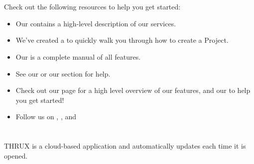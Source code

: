 \documentclass[letterpaper,10pt,english]{sphinxmanual}
\begin{document}
\section{}
\label{\detokenize{docs/introduction/index-thrux:new-user}}\label{\detokenize{docs/introduction/index-thrux:id1}}
Check out the following resources to help you get started:
\begin{itemize}
\item {} 
Our {\hyperref[\detokenize{docs/productoverview/index-product_overview:product-overview}]{}} contains a high-level description of our services.

\item {} 
We’ve created a {\hyperref[\detokenize{docs/tutorial/index-tutorial:tutorial-project}]{}} to quickly walk you through how to create a Project.

\item {} 
Our {\hyperref[\detokenize{docs/userguide/index-user_guide:user-guide}]{}} is a complete manual of all features.

\item {} 
See our {\hyperref[\detokenize{docs/faq:frequently-asked-questions}]{}} or our {\hyperref[\detokenize{docs/definitions/index-definitions:definitions}]{}} section for help.

\item {} 
Check out our  page for a high level overview of our features, and our  to help you get started!

\item {} 
Follow us on , , and 

\end{itemize}


\section{}
\label{\detokenize{docs/introduction/index-thrux:setting-up-your-account-installation-and-receiving-updates}}\label{\detokenize{docs/introduction/index-thrux:account-portal}}
THRUX is a cloud-based application and automatically updates each time it is opened.
\end{document}
